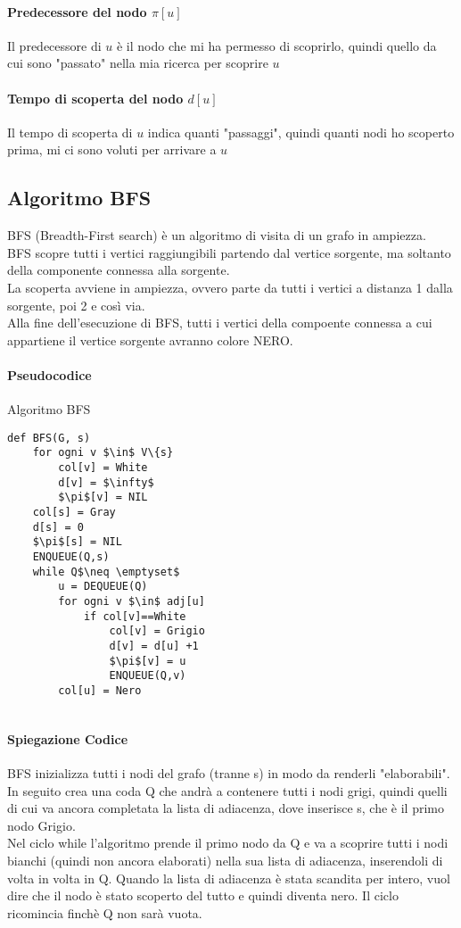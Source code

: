 \documentclass[12pt, a4paper, openany]{book}
\begin{document}
\paragraph{Predecessore del nodo $\pi[u]$}
Il predecessore di $u$ è il nodo che mi ha permesso di scoprirlo, quindi quello da cui sono "passato" nella mia ricerca per scoprire $u$
\paragraph{Tempo di scoperta del nodo $d[u]$}
Il tempo di scoperta di $u$ indica quanti "passaggi", quindi quanti nodi ho scoperto prima, mi ci sono voluti per arrivare a $u$

\subsection{Algoritmo BFS}
BFS (Breadth-First search) è un algoritmo di visita di un grafo in ampiezza.
\\BFS scopre tutti i vertici raggiungibili partendo dal vertice sorgente, ma soltanto della componente connessa alla sorgente.
\\La scoperta avviene in ampiezza, ovvero parte da tutti i vertici a distanza 1 dalla sorgente, poi 2 e così via.
\\Alla fine dell'esecuzione di BFS, tutti i vertici della compoente connessa a cui appartiene il vertice sorgente avranno colore NERO.

\paragraph{Pseudocodice} Algoritmo BFS
\begin{lstlisting}
def BFS(G, s)
    for ogni v $\in$ V\{s}
        col[v] = White
        d[v] = $\infty$
        $\pi$[v] = NIL
    col[s] = Gray
    d[s] = 0
    $\pi$[s] = NIL
    ENQUEUE(Q,s)
    while Q$\neq \emptyset$
        u = DEQUEUE(Q)
        for ogni v $\in$ adj[u]
            if col[v]==White
                col[v] = Grigio
                d[v] = d[u] +1
                $\pi$[v] = u
                ENQUEUE(Q,v)
        col[u] = Nero
    
\end{lstlisting}
\paragraph{Spiegazione Codice}
BFS inizializza tutti i nodi del grafo (tranne s) in modo da renderli "elaborabili".
In seguito crea una coda Q che andrà a contenere tutti i nodi grigi, quindi quelli di cui va ancora completata la lista di adiacenza,
dove inserisce s, che è il primo nodo Grigio.
\\Nel ciclo while l'algoritmo prende il primo nodo da Q e va a scoprire tutti i nodi bianchi (quindi non ancora elaborati) nella sua lista di adiacenza,
inserendoli di volta in volta in Q. Quando la lista di adiacenza è stata scandita per intero, vuol dire che il nodo è stato scoperto del tutto e quindi diventa nero.
Il ciclo ricomincia finchè Q non sarà vuota.
\end{document}

